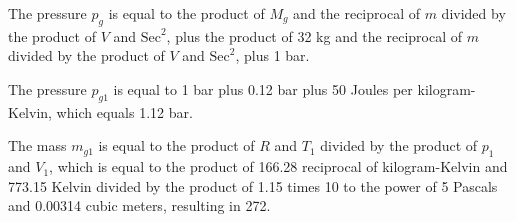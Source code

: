 The pressure \( p_g \) is equal to the product of \( M_g \) and the reciprocal of \( m \) divided by the product of \( V \) and \( \text{Sec}^2 \), plus the product of 32 kg and the reciprocal of \( m \) divided by the product of \( V \) and \( \text{Sec}^2 \), plus 1 bar.

The pressure \( p_{g1} \) is equal to 1 bar plus 0.12 bar plus 50 Joules per kilogram-Kelvin, which equals 1.12 bar.

The mass \( m_{g1} \) is equal to the product of \( R \) and \( T_1 \) divided by the product of \( p_1 \) and \( V_1 \), which is equal to the product of 166.28 reciprocal of kilogram-Kelvin and 773.15 Kelvin divided by the product of 1.15 times 10 to the power of 5 Pascals and 0.00314 cubic meters, resulting in 272.